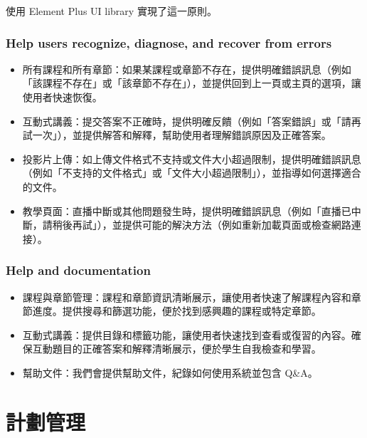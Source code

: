 \documentclass[12pt]{article}
\begin{document}
使用 Element Plus UI library 實現了這一原則。

\subsubsection{Help users recognize, diagnose, and recover from errors}

\begin{itemize}
  \item 所有課程和所有章節：如果某課程或章節不存在，提供明確錯誤訊息（例如「該課程不存在」或「該章節不存在」），並提供回到上一頁或主頁的選項，讓使用者快速恢復。
  \item 互動式講義：提交答案不正確時，提供明確反饋（例如「答案錯誤」或「請再試一次」），並提供解答和解釋，幫助使用者理解錯誤原因及正確答案。
  \item 投影片上傳：如上傳文件格式不支持或文件大小超過限制，提供明確錯誤訊息（例如「不支持的文件格式」或「文件大小超過限制」），並指導如何選擇適合的文件。
  \item 教學頁面：直播中斷或其他問題發生時，提供明確錯誤訊息（例如「直播已中斷，請稍後再試」），並提供可能的解決方法（例如重新加載頁面或檢查網路連接）。
\end{itemize}

\subsubsection{Help and documentation}

\begin{itemize}
  \item 課程與章節管理：課程和章節資訊清晰展示，讓使用者快速了解課程內容和章節進度。提供搜尋和篩選功能，便於找到感興趣的課程或特定章節。
  \item 互動式講義：提供目錄和標籤功能，讓使用者快速找到查看或復習的內容。確保互動題目的正確答案和解釋清晰展示，便於學生自我檢查和學習。
  \item 幫助文件：我們會提供幫助文件，紀錄如何使用系統並包含 Q\&A。
\end{itemize}

\section{計劃管理}
\end{document}
